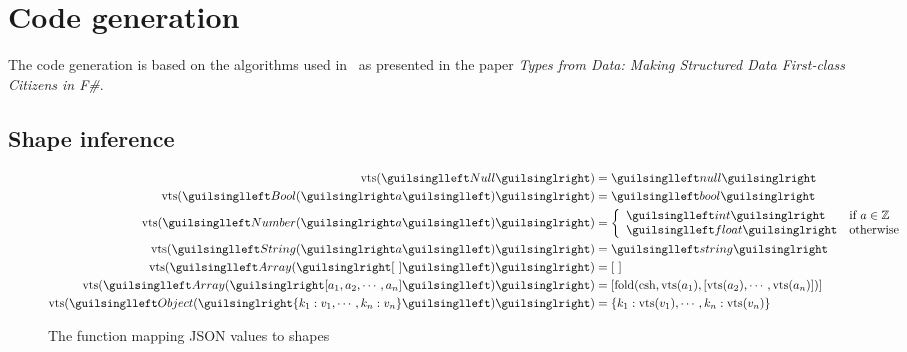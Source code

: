 
\chapter{Code generation}

The code generation is based on the algorithms used in \fsharpdata\ as presented in the paper \emph{Types from Data: Making Structured Data First-class Citizens in F\#}\cite{fsharp-types-from-data}.

\section{Shape inference}


\begin{figure}[ht!]
\begin{align*}
\shap(‹Null›)          &= ‹null› \\
\shap(‹Bool(›a‹)›)     &= ‹bool› \\
\shap(‹Number(›a‹)›)   &= \left\{\begin{array}{ll}
  ‹int›   & \text{if } a \in \mathbb{Z} \\
  ‹float› & \text{otherwise}
\end{array}\right.\\
\shap(‹String(›a‹)›)   &= ‹string› \\
\shap(‹Array(›[\ ]‹)›) &= [\ ] \\
\shap(‹Array(›[a_1, a_2, \cdots, a_n]‹)›) &= [\fold(\csh, \shap(a_1), [\shap(a_2), \cdots, \shap(a_n)])] \\
\shap(‹Object(›\{ k_1 : v_1, \cdots, k_n : v_n \}‹)›) &= \{ k_1 : \shap(v_1), \cdots, k_n : \shap(v_n) \}
\end{align*}
\caption{The function mapping JSON values to shapes}
\label{fig:shap}
\end{figure}


